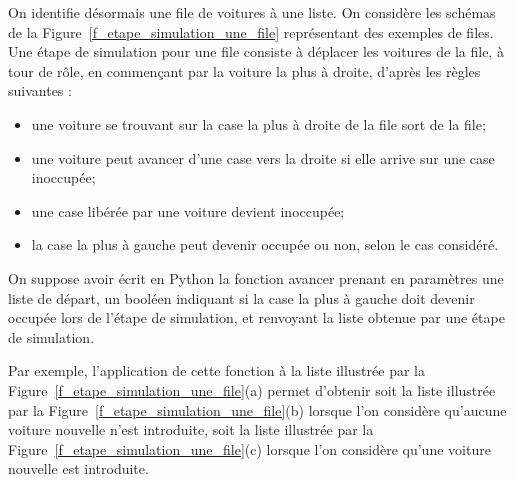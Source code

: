 On identifie désormais une file de voitures à une liste. On considère les schémas de la Figure~\ref{f_etape_simulation_une_file}
représentant des exemples de files. Une étape de simulation pour une file consiste à déplacer les
voitures de la file, à tour de r\^ole, en commen\c cant par la voiture la plus à droite, d'après les règles
suivantes :

\begin{itemize}
	\item  une voiture se trouvant sur la case la plus à droite de la file sort de la file;
    \item  une voiture peut avancer d'une case vers la droite si elle arrive sur une case inoccupée;
    \item  une case libérée par une voiture devient inoccupée;
    \item la case la plus à gauche peut devenir occupée ou non, selon le cas considéré.
\end{itemize}

On suppose avoir écrit en Python la fonction avancer prenant en paramètres une liste de départ,
un booléen indiquant si la case la plus à gauche doit devenir occupée lors de l'étape de simulation,
et renvoyant la liste obtenue par une étape de simulation.


Par exemple, l'application de cette fonction à la liste illustrée par la Figure~\ref{f_etape_simulation_une_file}(a) permet d'obtenir
soit la liste illustrée par la Figure~\ref{f_etape_simulation_une_file}(b) lorsque l'on considère qu'aucune voiture nouvelle n'est
introduite, soit la liste illustrée par la Figure~\ref{f_etape_simulation_une_file}(c) lorsque l'on considère qu'une voiture nouvelle est
introduite.




\hfill
\hfill {}

